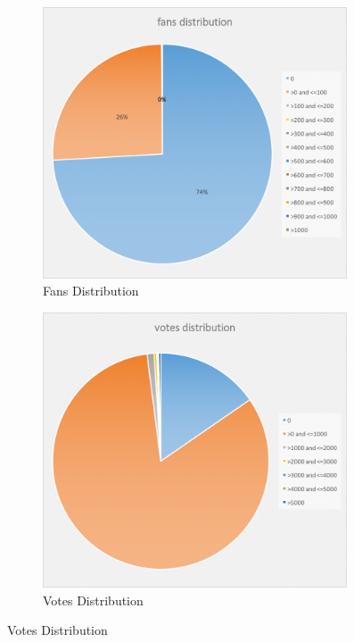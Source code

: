 \documentclass[11pt, oneside]{article}   	%
\begin{document}
\begin{figure}[t]
\begin{subfigure}[b]{0.45\textwidth}
        \label{fig:review}
  \end{subfigure}
  \begin{subfigure}[b]{0.45\textwidth}        
        \includegraphics[width=0.99\textwidth]{figures/fans.png}
        \caption{Fans Distribution}
        \label{fig:fans}
  \end{subfigure}
  \begin{subfigure}[b]{0.45\textwidth}        
        \includegraphics[width=0.99\textwidth]{figures/votes.png}
        \caption{Votes Distribution}
        \label{fig:votes}
  \end{subfigure}  
\label{fig:dis}
\end{figure}
\end{document}
